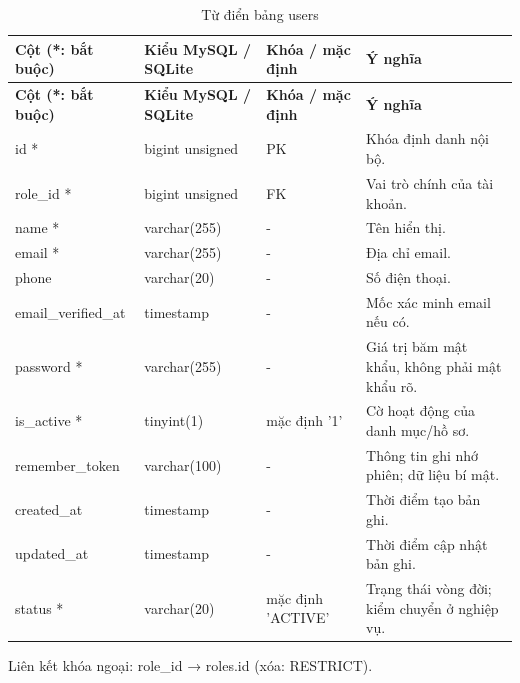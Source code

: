 {\fontsize{10}{12}\selectfont\setlength{\tabcolsep}{3pt}\renewcommand{\arraystretch}{1.12}
\begin{longtable}{@{}L{\textwidth-4.86pt\relax} L{\textwidth-3.96pt\relax} L{\textwidth-2.88pt\relax} L{\textwidth-6.3pt\relax}@{}}
\caption{Từ điển bảng users}\\
\toprule
\textbf{Cột (*:\allowbreak{} bắt buộc)} & \textbf{Kiểu My\allowbreak{}SQL /\allowbreak{} SQLite} & \textbf{Khóa /\allowbreak{} mặc định} & \textbf{Ý nghĩa}\\\midrule
\endfirsthead
\toprule
\textbf{Cột (*:\allowbreak{} bắt buộc)} & \textbf{Kiểu My\allowbreak{}SQL /\allowbreak{} SQLite} & \textbf{Khóa /\allowbreak{} mặc định} & \textbf{Ý nghĩa}\\\midrule
\endhead
\bottomrule\endlastfoot
id * & bigint unsigned & PK & Khóa định danh nội bộ.\allowbreak{}\\[1pt]
role\_\allowbreak{}id * & bigint unsigned & FK & Vai trò chính của tài khoản.\allowbreak{}\\[1pt]
name * & varchar(255) & - & Tên hiển thị.\allowbreak{}\\[1pt]
email * & varchar(255) & - & Địa chỉ email.\allowbreak{}\\[1pt]
phone & varchar(20) & - & Số điện thoại.\allowbreak{}\\[1pt]
email\_\allowbreak{}verified\_\allowbreak{}at & timestamp & - & Mốc xác minh email nếu có.\allowbreak{}\\[1pt]
password * & varchar(255) & - & Giá trị băm mật khẩu, không phải mật khẩu rõ.\allowbreak{}\\[1pt]
is\_\allowbreak{}active * & tinyint(1) & mặc định '1' & Cờ hoạt động của danh mục/\allowbreak{}hồ sơ.\allowbreak{}\\[1pt]
remember\_\allowbreak{}token & varchar(100) & - & Thông tin ghi nhớ phiên; dữ liệu bí mật.\allowbreak{}\\[1pt]
created\_\allowbreak{}at & timestamp & - & Thời điểm tạo bản ghi.\allowbreak{}\\[1pt]
updated\_\allowbreak{}at & timestamp & - & Thời điểm cập nhật bản ghi.\allowbreak{}\\[1pt]
status * & varchar(20) & mặc định 'ACTIVE' & Trạng thái vòng đời; kiểm chuyển ở nghiệp vụ.\allowbreak{}\\[1pt]
\end{longtable}}
Liên kết khóa ngoại:\allowbreak{} role\_\allowbreak{}id → roles.\allowbreak{}id (xóa:\allowbreak{} RESTRICT).\allowbreak{}

